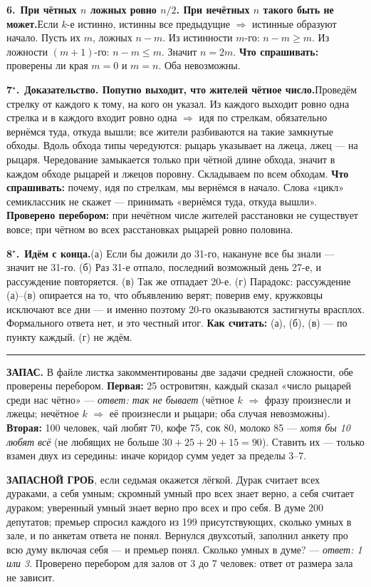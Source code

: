 \documentclass[10pt,a4paper]{article}
\newcommand{\zz}[3]{\par\vspace{5pt}\noindent%
  \textbf{#1.}\ \textbf{#2}\newline\small #3\normalsize\par}
\begin{document}
\zz{6}{При чётных $n$ ложных ровно $n/2$. При нечётных $n$ такого быть не может.}
{Если $k$-е истинно, истинны все предыдущие $\Rightarrow$ истинные образуют начало. Пусть их $m$, ложных $n-m$. Из истинности $m$-го: $n-m\ge m$. Из ложности $(m{+}1)$-го: $n-m\le m$. Значит $n=2m$.
\textbf{Что спрашивать:} проверены ли края $m=0$ и $m=n$. Оба невозможны.}

\zz{7$^\star$}{Доказательство. Попутно выходит, что жителей чётное число.}
{Проведём стрелку от каждого к тому, на кого он указал. Из каждого выходит ровно одна стрелка и в каждого входит ровно одна $\Rightarrow$ идя по стрелкам, обязательно вернёмся туда, откуда вышли; все жители разбиваются на такие замкнутые обходы. Вдоль обхода типы чередуются: рыцарь указывает на лжеца, лжец — на рыцаря. Чередование замыкается только при чётной длине обхода, значит в каждом обходе рыцарей и лжецов поровну. Складываем по всем обходам.
\textbf{Что спрашивать:} почему, идя по стрелкам, мы вернёмся в начало. Слова «цикл» семиклассник не скажет — принимать «вернёмся туда, откуда вышли».
\textbf{Проверено перебором:} при нечётном числе жителей расстановки не существует вовсе; при чётном во всех расстановках рыцарей ровно половина.}

\zz{8$^\star$}{Идём с конца.}
{(а) Если бы дожили до 31-го, накануне все бы знали — значит не 31-го. (б) Раз 31-е отпало, последний возможный день 27-е, и рассуждение повторяется. (в) Так же отпадает 20-е.
(г) Парадокс: рассуждение (а)–(в) опирается на то, что объявлению верят; поверив ему, кружковцы исключают все дни — и именно поэтому 20-го оказываются застигнуты врасплох. Формального ответа нет, и это честный итог.
\textbf{Как считать:} (а), (б), (в) — по пункту каждый. (г) не ждём.}

\vspace{6pt}\hrule\vspace{4pt}

\noindent\small\textbf{ЗАПАС.} В файле листка закомментированы две задачи средней сложности, обе проверены перебором.
\textbf{Первая:} 25 островитян, каждый сказал «число рыцарей среди нас чётно» — \emph{ответ: так не бывает} (чётное $k$ $\Rightarrow$ фразу произнесли и лжецы; нечётное $k$ $\Rightarrow$ её произнесли и рыцари; оба случая невозможны).
\textbf{Вторая:} 100 человек, чай любят 70, кофе 75, сок 80, молоко 85 — \emph{хотя бы 10 любят всё} (не любящих не больше $30{+}25{+}20{+}15=90$).
Ставить их — только взамен двух из середины: иначе коридор сумм уедет за пределы 3–7.

\vspace{3pt}
\noindent\small\textbf{ЗАПАСНОЙ ГРОБ}, если седьмая окажется лёгкой. Дурак считает всех дураками, а себя умным; скромный умный про всех знает верно, а себя считает дураком; уверенный умный знает верно про всех и про себя. В думе 200 депутатов; премьер спросил каждого из 199 присутствующих, сколько умных в зале, и по анкетам ответа не понял. Вернулся двухсотый, заполнил анкету про всю думу включая себя — и премьер понял. Сколько умных в думе? — \emph{ответ: 1 или 3}. Проверено перебором для залов от 3 до 7 человек: ответ от размера зала не зависит.\normalsize
\end{document}
